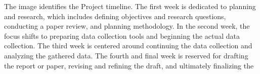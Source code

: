 \documentclass{article}
\begin{document}
    The image identifies the Project timeline. The first week is dedicated to planning and research, which includes defining objectives and research questions, conducting a paper review, and planning methodology. In the second week, the focus shifts to preparing data collection tools and beginning the actual data collection. The third week is centered around continuing the data collection and analyzing the gathered data. The fourth and final week is reserved for drafting the report or paper, revising and refining the draft, and ultimately finalizing the 
\end{document}

